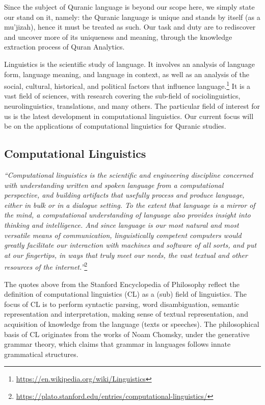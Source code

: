 \documentclass[
]{article}
\begin{document}
Since the subject of Quranic language is beyond our scope here, we simply state our stand on it, namely: the Quranic language is unique and stands by itself (as a mu'jizah), hence it must be treated as such. Our task and duty are to rediscover and uncover more of its uniqueness and meaning, through the knowledge extraction process of Quran Analytics.

Linguistics is the scientific study of language. It involves an analysis of language form, language meaning, and language in context, as well as an analysis of the social, cultural, historical, and political factors that influence language.\footnote{\url{https://en.wikipedia.org/wiki/Linguistics}} It is a vast field of sciences, with research covering the sub-field of sociolinguistics, neurolinguistics, translations, and many others. The particular field of interest for us is the latest development in computational linguistics. Our current focus will be on the applications of computational linguistics for Quranic studies.

\hypertarget{computational-linguistics}{%
\subsection{Computational Linguistics}\label{computational-linguistics}}

\emph{``Computational linguistics is the scientific and engineering discipline concerned with understanding written and spoken language from a computational perspective, and building artifacts that usefully process and produce language, either in bulk or in a dialogue setting. To the extent that language is a mirror of the mind, a computational understanding of language also provides insight into thinking and intelligence. And since language is our most natural and most versatile means of communication, linguistically competent computers would greatly facilitate our interaction with machines and software of all sorts, and put at our fingertips, in ways that truly meet our needs, the vast textual and other resources of the internet.''}\footnote{\url{https://plato.stanford.edu/entries/computational-linguistics/}}

The quotes above from the Stanford Encyclopedia of Philosophy reflect the definition of computational linguistics (CL) as a (sub) field of linguistics. The focus of CL is to perform syntactic parsing, word disambiguation, semantic representation and interpretation, making sense of textual representation, and acquisition of knowledge from the language (texts or speeches). The philosophical basis of CL originates from the works of Noam Chomsky, under the generative grammar theory, which claims that grammar in languages follows innate grammatical structures.
\end{document}

